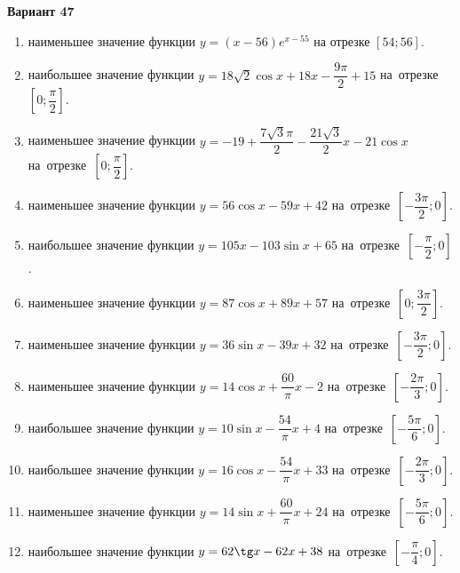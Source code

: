 \documentclass[a4paper,10pt]{article}
\begin{document}
\begin{center}\Large\textbf{Вариант 47}\end{center}

\begin{enumerate}
\item {} наименьшее значение функции $y = \left(x-56\right)e^{x-55}$ на отрезке $\left[54;56\right]$.

\item {} наибольшее значение функции $y = 18\sqrt{2}\cos x+18x-\dfrac{9\pi}{2} +15$ на~отрезке~$\left[0;\dfrac{\pi }{2}\right]$.

\item {} наименьшее значение функции $y = -19+\dfrac{7\sqrt{3} \pi}{2}-\dfrac{21\sqrt{3}}{2}x-21\cos x$ на~отрезке~$\left[0;\dfrac{\pi }{2}\right]$.

\item {} наименьшее значение функции $y = 56\cos x-59x+42$ на~отрезке~$\left[-\dfrac{3\pi }{2};0\right]$.

\item {} наибольшее значение функции $y = 105x-103\sin x+65$ на~отрезке~$\left[-\dfrac{\pi }{2};0\right]$.

\item {} наименьшее значение функции $y = 87\cos x+89x+57$ на~отрезке~$\left[0;\dfrac{3\pi }{2}\right]$.

\item {} наименьшее значение функции $y = 36\sin x-39x+32$ на~отрезке~$\left[-\dfrac{3\pi }{2};0\right]$.

\item {} наименьшее значение функции $y = 14\cos x+\dfrac{60}{\pi }x -2$ на~отрезке~$\left[-\dfrac{2\pi }{3};0\right]$.

\item {} наибольшее значение функции $y = 10\sin x-\dfrac{54}{\pi }x+4$ на~отрезке~$\left[-\dfrac{5\pi }{6};0\right]$.

\item {} наибольшее значение функции $y = 16\cos x-\dfrac{54}{\pi }x+33$ на~отрезке~$\left[-\dfrac{2\pi }{3};0\right]$.

\item {} наименьшее значение функции $y = 14\sin x+\dfrac{60}{\pi }x+24$ на~отрезке~$\left[-\dfrac{5\pi }{6};0\right]$.

\item {} наибольшее значение функции $y = 62\tg x-62x+38$ на~отрезке~$\left[-\dfrac{\pi }{4};0\right]$.


\end{enumerate}
\end{document}
